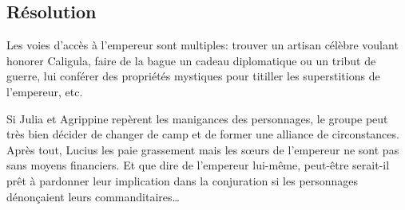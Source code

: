 \subsection{Résolution}

Les voies d'accès à l'empereur sont multiples: trouver un artisan célèbre voulant honorer Caligula, faire de la bague un cadeau diplomatique ou un tribut de guerre, lui conférer des propriétés mystiques pour titiller les superstitions de l'empereur, etc.

Si Julia et Agrippine repèrent les manigances des personnages, le groupe peut très bien décider de changer de camp et de former une alliance de circonstances.
Après tout, Lucius les paie grassement mais les sœurs de l'empereur ne sont pas sans moyens financiers.
Et que dire de l'empereur lui-même, peut-être serait-il prêt à pardonner leur implication dans la conjuration si les personnages dénonçaient leurs commanditaires\dots

